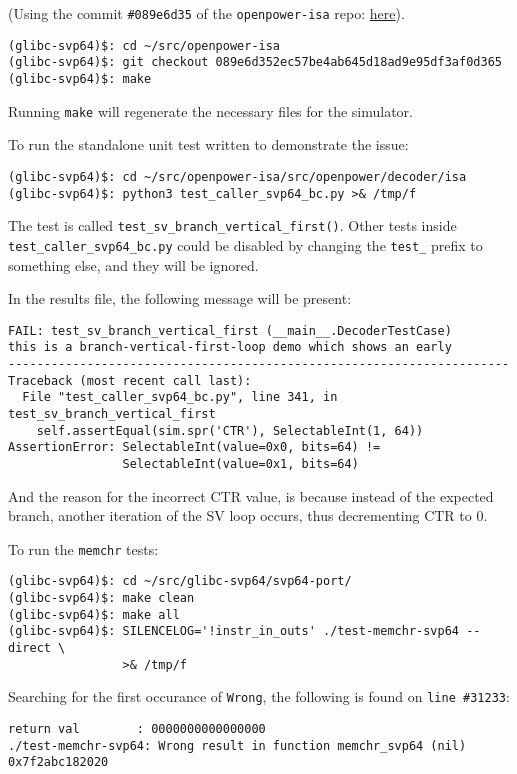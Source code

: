 (Using the commit \texttt{\#089e6d35} of the \texttt{openpower-isa} repo:
\href{https://git.libre-soc.org/?p=openpower-isa.git;a=commitdiff;h=089e6d352ec57be4ab645d18ad9e95df3af0d365}{here}).

\begin{verbatim}
(glibc-svp64)$: cd ~/src/openpower-isa
(glibc-svp64)$: git checkout 089e6d352ec57be4ab645d18ad9e95df3af0d365
(glibc-svp64)$: make
\end{verbatim}

Running \texttt{make} will regenerate the necessary files for the simulator.

To run the standalone unit test written to demonstrate the issue:
\begin{verbatim}
(glibc-svp64)$: cd ~/src/openpower-isa/src/openpower/decoder/isa
(glibc-svp64)$: python3 test_caller_svp64_bc.py >& /tmp/f
\end{verbatim}

The test is called \texttt{test\_sv\_branch\_vertical\_first()}. Other tests inside
\texttt{test\_caller\_svp64\_bc.py} could be disabled by changing the
\texttt{test\_} prefix to something else, and they will be ignored.

In the results file, the following message will be present:
\begin{verbatim}
FAIL: test_sv_branch_vertical_first (__main__.DecoderTestCase)
this is a branch-vertical-first-loop demo which shows an early
----------------------------------------------------------------------
Traceback (most recent call last):
  File "test_caller_svp64_bc.py", line 341, in test_sv_branch_vertical_first
    self.assertEqual(sim.spr('CTR'), SelectableInt(1, 64))
AssertionError: SelectableInt(value=0x0, bits=64) !=
                SelectableInt(value=0x1, bits=64)
\end{verbatim}

And the reason for the incorrect \acrshort{CTR} value, is because instead of the expected
branch, another iteration of the \acrfull{SV} loop occurs, thus
decrementing \acrshort{CTR} to 0.

To run the \texttt{memchr} tests:
\begin{verbatim}
(glibc-svp64)$: cd ~/src/glibc-svp64/svp64-port/
(glibc-svp64)$: make clean
(glibc-svp64)$: make all
(glibc-svp64)$: SILENCELOG='!instr_in_outs' ./test-memchr-svp64 --direct \
                >& /tmp/f
\end{verbatim}


Searching for the first occurance of \texttt{Wrong}, the following is found on
\texttt{line \#31233}:
\begin{verbatim}
return val        : 0000000000000000
./test-memchr-svp64: Wrong result in function memchr_svp64 (nil) 0x7f2abc182020
\end{verbatim}

